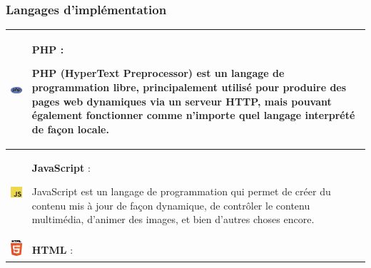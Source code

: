\documentclass{article}
\begin{document}
                \subsubsection{Langages d'implémentation}
                    \begin{table}[h!]
                        \centering
                        \begin{tabular}{|m{2cm}|m{12cm}|}
                            \hline
                            \includegraphics[width=2cm]{assets/logos/PHP_logo.png} &
                            \textbf{PHP} :
                            
                            PHP (HyperText Preprocessor) est un langage de programmation libre, principalement utilisé pour produire des pages web dynamiques via un serveur HTTP, mais pouvant également fonctionner comme n'importe quel langage interprété de façon locale. \\
                            \hline
                            \includegraphics[width=2cm]{assets/logos/js.jpg} &
                            \textbf{JavaScript} :
                            
                            JavaScript est un langage de programmation qui permet de créer du contenu mis à jour de façon dynamique, de contrôler le contenu multimédia, d'animer des images, et bien d'autres choses encore. \\
                            \hline
                            \includegraphics[width=2cm]{assets/logos/html.jpg} &
                            \textbf{HTML} :
                            

\end{tabular}
\end{table}
\end{document}
